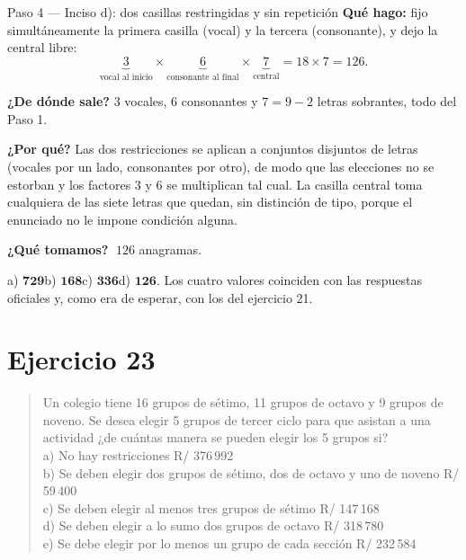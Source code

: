\documentclass[11pt]{article}
\begin{document}
\begin{paso}{Paso 4 --- Inciso d): dos casillas restringidas y sin repetición}
\textbf{Qué hago:} fijo simultáneamente la primera casilla (vocal) y la tercera (consonante), y dejo la
central libre:
\[
\underbrace{3}_{\text{vocal al inicio}}\times\underbrace{6}_{\text{consonante al final}}\times\underbrace{7}_{\text{central}}
=18\times7=126 .
\]

\textbf{¿De dónde sale?} $3$ vocales, $6$ consonantes y $7=9-2$ letras sobrantes, todo del Paso 1.

\textbf{¿Por qué?} Las dos restricciones se aplican a conjuntos disjuntos de letras (vocales por un lado,
consonantes por otro), de modo que las elecciones no se estorban y los factores $3$ y $6$ se multiplican
tal cual. La casilla central toma cualquiera de las siete letras que quedan, sin distinción de tipo, porque
el enunciado no le impone condición alguna.

\textbf{¿Qué tomamos?} $\;126$ anagramas.
\end{paso}

\begin{resp}
a) $\mathbf{729}$\quad b) $\mathbf{168}$\quad c) $\mathbf{336}$\quad d) $\mathbf{126}$. Los cuatro valores
coinciden con las respuestas oficiales y, como era de esperar, con los del ejercicio 21.
\end{resp}

\section*{Ejercicio 23}

\begin{quote}
Un colegio tiene 16 grupos de sétimo, 11 grupos de octavo y 9 grupos de noveno. Se desea elegir 5 grupos de
tercer ciclo para que asistan a una actividad ¿de cuántas manera se pueden elegir los 5 grupos si?\\
a) No hay restricciones \hfill R/ 376\,992\\
b) Se deben elegir dos grupos de sétimo, dos de octavo y uno de noveno \hfill R/ 59\,400\\
c) Se deben elegir al menos tres grupos de sétimo \hfill R/ 147\,168\\
d) Se deben elegir a lo sumo dos grupos de octavo \hfill R/ 318\,780\\
e) Se debe elegir por lo menos un grupo de cada sección \hfill R/ 232\,584
\end{quote}
\end{document}

